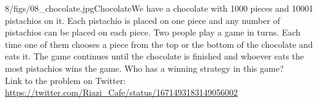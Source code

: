 \begin{problem}{8/figs/08_chocolate.jpg}{Chocolate}We have a chocolate with 1000 pieces and 10001 pistachios on it. Each pistachio is placed on one piece and any number of pistachios can be placed on each piece. Two people play a game in turns. Each time one of them chooses a piece from the top or the bottom of the chocolate and eats it. The game continues until the chocolate is finished and whoever eats the most pistachios wins the game. Who has a winning strategy in this game?\\[0.2cm]

Link to the problem on Twitter:  \url{https://twitter.com/Riazi_Cafe/status/1671493183149056002}\end{problem}